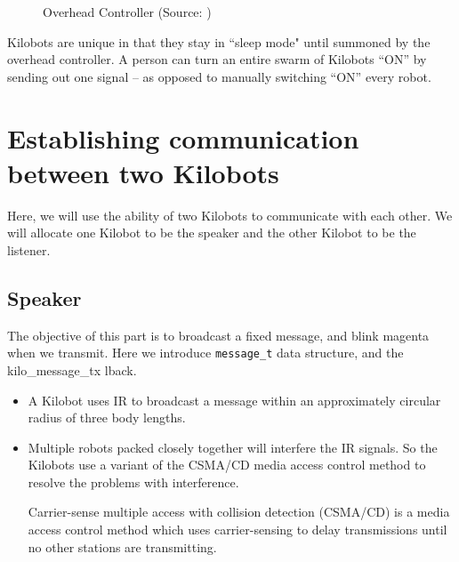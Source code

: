 \begin{figure}[H]
    \centering
	\caption{Overhead Controller (Source: \cite{kilobotics_manual})}
	\label{fig:ohc}
\end{figure}
\noindent Kilobots are unique in that they stay in ``sleep mode" until summoned by the overhead controller. A person can turn an entire swarm of Kilobots ``ON'' by sending out one signal -- as opposed to manually switching ``ON'' every robot.

\chapter{Establishing communication between two Kilobots}
Here, we will use the ability of two Kilobots to communicate with each other. We will allocate one Kilobot to be the speaker and the other Kilobot to be the listener.
\section{Speaker}
 The objective of this part is to broadcast a fixed message, and blink magenta when we transmit. Here we introduce \texttt{message\_t} data structure, and the kilo\_message\_tx lback.
\begin{itemize}
\item A Kilobot uses IR to broadcast a message within an approximately circular radius of three body lengths.

\item  Multiple robots packed closely together will interfere the IR signals. So the Kilobots use a variant of the CSMA/CD media access control method  to resolve the problems with interference.\par

Carrier-sense multiple access with collision detection (CSMA/CD) is a media access control method which uses carrier-sensing to delay transmissions until no other stations are transmitting. 
\end{itemize}

